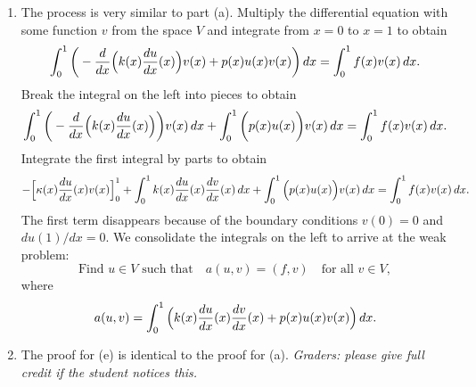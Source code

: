 {\begin{solution}
\begin{enumerate}
\item The process is very similar to part (a).  Multiply the differential equation with some function $v$
      from the space $V$ and integrate from $x=0$ to $x=1$ to obtain
     \[ \int_0^1 \bigg(-{d\over dx} \Big(k(x) {du \over dx}(x)\Big) v(x)
                      + p(x) u(x) v(x) \bigg)\,dx   
          = \int_0^1 f(x)v(x)\,dx.\]
      Break the integral on the left into pieces to obtain
     \[  \int_0^1 \bigg(-{d\over dx} \Big(k(x) {du \over dx}(x)\Big)\bigg) v(x)\,dx
       + \int_0^1 \bigg( p(x) u(x)\bigg) v(x)\,dx 
       = \int_0^1 f(x)v(x)\, dx.\]
     Integrate the first integral by parts to obtain
     \[ -\Big[ \kappa(x) {du \over dx}(x) v(x) \Big]_0^1 
        + \int_0^1 k(x) {du \over dx}(x) {dv\over dx}(x)\,dx
       + \int_0^1 \Big( p(x) u(x)\Big) v(x)\,dx 
       = \int_0^1 f(x)v(x)\, dx.\]
     The first term disappears because of the boundary conditions
     $v(0)=0$ and ${du(1)/dx} = 0$.  We consolidate the integrals
     on the left to arrive at the weak problem:
      \[ \mbox{Find $u\in V$ such that}\quad
          a(u,v) = (f,v) \quad \mbox{for all $v\in V$},\]
     where 
     \[ a(u,v) = 
         \int_0^1 \Big( k(x) {du \over dx}(x) {dv\over dx}(x)
                       + p(x) u(x) v(x)\Big)\,dx.\]
       
\item The proof for (e) is identical to the proof for (a).  \emph{Graders: please give full credit if the student notices this.}
\end{enumerate}
\end{solution}}{}


